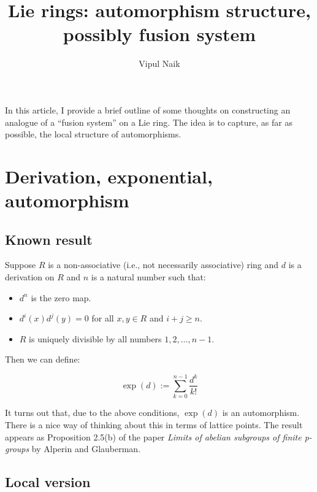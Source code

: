 \documentclass[10pt]{amsart}
\title{Lie rings: automorphism structure, possibly fusion system}
\author{Vipul Naik}
\begin{document}
\maketitle

In this article, I provide a brief outline of some thoughts on
constructing an analogue of a ``fusion system'' on a Lie ring. The
idea is to capture, as far as possible, the local structure of
automorphisms.

\section{Derivation, exponential, automorphism}

\subsection{Known result}

Suppose $R$ is a non-associative (i.e., not necessarily associative)
ring and $d$ is a derivation on $R$ and $n$ is a natural number such
that:

\begin{itemize}
\item $d^n$ is the zero map.
\item $d^i(x)d^j(y) = 0$ for all $x,y \in R$ and $i + j \ge n$.
\item $R$ is uniquely divisible by all numbers $1,2,\dots,n-1$.
\end{itemize}

Then we can define:

$$\exp(d) := \sum_{k=0}^{n-1} \frac{d^k}{k!}$$

It turns out that, due to the above conditions, $\exp(d)$ is an
automorphism. There is a nice way of thinking about this in terms of
lattice points. 
The result appears as Proposition 2.5(b) of the paper {\em Limits of abelian
subgroups of finite p-groups} by Alperin and Glauberman.

\subsection{Local version}
\end{document}
